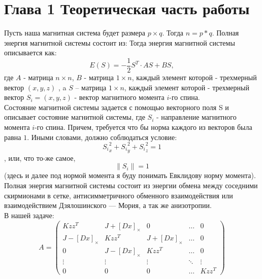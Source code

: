 \documentclass[ 12pt,x11names]{article}
\begin{document}
    \newpage
    \section{Глава 1 Теоретическая часть работы}
    Пусть наша магнитная система будет размера $p \times  q$. Тогда $n =  p * q$.
    Полная энергия магнитной системы состоит из:
    Тогда энергия магнитной системы описывается как:
   \begin{equation}
    E(S) = - \frac{1}{2}S^T \cdot AS + BS,
    \label{eq:ref}
    \end{equation}
    где $A$ - матрица $n \times n$, $B$ - матрица $1 \times n$,
    каждый элемент которой - трехмерный вектор $(x, y, z)$
    , a $S$ -- матрица $1\times n$, каждый элемент которой - трехмерный вектор $S_i = (x, y, z)$ - вектор магнитного момента $i$-го спина. \\
    Состояние магнитной системы задается с помощью векторного поля S и описывает состояние магнитной системы, где $S_i$ - направление магнитного момента $i$-го  спина.
    Причем, требуется что бы норма каждого из векторов была равна $1$. Иными словами, должно соблюдаться условие:\\
    \begin{equation}
     {S_{i}}_x^2 + {S_{i}}_y^2 + {S_{i}}_z^2 = 1
      \label{eq:ref}
    \end{equation},
    или,  что то-же самое,
    \begin{equation}
     \|S_{i}\| = 1
        \label{eq:ref}
    \end{equation}
    (здесь и далее под нормой момента я буду понимать Евклидову норму момента).
    Полная энергия магнитной системы состоит из энергии обмена между соседними скирмионами в сетке,  антисимметричного обменного взаимодействия или взаимодействием Дзялошинского — Мория, а так же анизотропии.\\
    В нашей задаче:
    \begin{equation*}
    A = \left(
    \begin{array}{ccccс}
    Kzz^T & J + [Dx]_\times & 0  & \ldots & 0\\
    J - [Dx]_\times & Kzz^T & J + [Dx]_\times &\ldots & 0\\
    0 & J - [Dx]_\times & Kzz^T &\ldots & 0\\
    \vdots &\vdots &\vdots &\ddots & \vdots\\
    0 & 0 &  0 &\ldots & Kzz^T
    \end{array}
    \right)
    \label{eq:ref}
    \end{equation*}\\
\end{document}
